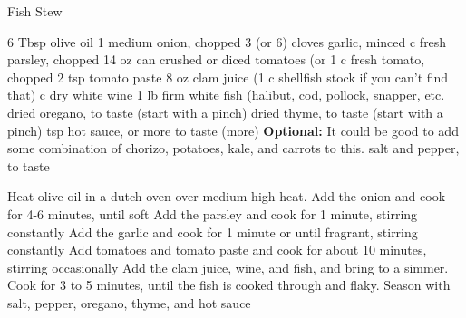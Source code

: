 \documentclass[12pt]{cookbook}
\begin{document}
\begin{recipe}{Fish Stew}


\ingredients
{6 Tbsp olive oil}
{1 medium onion, chopped}
{3 (or 6) cloves garlic, minced}
{ c fresh parsley, chopped}
{14 oz can crushed or diced tomatoes (or 1 c fresh tomato, chopped}
{2 tsp tomato paste}
{8 oz clam juice (1 c shellfish stock if you can't find that)}
{ c dry white wine}
{1  lb firm white fish (halibut, cod, pollock, snapper, etc.}
{dried oregano, to taste (start with a pinch)}
{dried thyme, to taste (start with a pinch)}
{ tsp hot sauce, or more to taste (more)}
{\textbf{Optional:} It could be good to add some combination of chorizo, potatoes, kale, and carrots to this.}
{salt and pepper, to taste}
\stopingredients

\preparation
{Heat olive oil in a dutch oven over medium-high heat. Add the onion and cook for 4-6 minutes, until soft}
{Add the parsley and cook for 1 minute, stirring constantly}
{Add the garlic and cook for 1 minute or until fragrant, stirring constantly}
{Add tomatoes and tomato paste and cook for about 10 minutes, stirring occasionally}
{Add the clam juice, wine, and fish, and bring to a simmer. Cook for 3 to 5 minutes, until the fish is cooked through and flaky.}
{Season with salt, pepper, oregano, thyme, and hot sauce}
\stopprep
\end{recipe}
\end{document}
